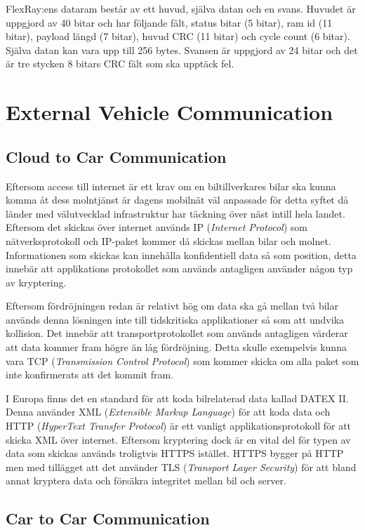 \documentclass[a4paper]{IEEEtran}
\begin{document}
FlexRay:ens dataram består av ett huvud, själva datan och en svans. Huvudet är uppgjord av 40 bitar och har följande fält, status bitar (5 bitar), ram id (11 bitar), payload längd (7 bitar), huvud CRC (11 bitar) och cycle count (6 bitar). 
Själva datan kan vara upp till 256 bytes. Svansen är uppgjord av 24 bitar och det är tre stycken 8 bitars CRC fält som ska upptäck fel. \cite{FlexRayOverview}

\section{External Vehicle Communication}
\subsection{Cloud to Car Communication}
Eftersom access till internet är ett krav om en biltillverkares bilar ska kunna komma åt dess molntjänst är dagens mobilnät väl anpassade för detta syftet då länder med välutvecklad infrastruktur har täckning över näst intill hela landet. 
Eftersom det skickas över internet används IP (\emph{Internet Protocol}) som nätverksprotokoll och IP-paket kommer då skickas mellan bilar och molnet. 
Informationen som skickas kan innehålla konfidentiell data så som position, detta innebär att applikations protokollet som används antagligen använder någon typ av kryptering.

Eftersom fördröjningen redan är relativt hög om data ska gå mellan två bilar används denna lösningen inte till tidskritiska applikationer så som att undvika kollision. 
Det innebär att transportprotokollet som används antagligen värderar att data kommer fram högre än låg fördröjning. 
Detta skulle exempelvis kunna vara TCP (\emph{Transmission Control Protocol}) som kommer skicka om alla paket som inte konfirmerats att det kommit fram. \cite{TCP}

I Europa finns det en standard för att koda bilrelaterad data kallad DATEX \textrm{II}. 
Denna använder XML (\emph{Extensible Markup Language}) för att koda data och HTTP (\emph{HyperText Transfer Protocol}) är ett vanligt applikationsprotokoll för att skicka XML över  internet.
Eftersom kryptering dock är en vital del för typen av data som skickas används troligtvis HTTPS istället. 
HTTPS bygger på HTTP men med tillägget att det använder TLS (\emph{Transport Layer Security}) för att bland annat kryptera data och försäkra integritet mellan bil och server. \cite{DATEXII,HTTPS,TLS}

\subsection{Car to Car Communication}
\end{document}
